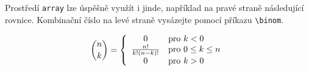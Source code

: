 \documentclass[hidelinks, twocolumn, a4paper, 11pt]{article}
\theoremstyle{definition}
\begin{document}
Prostředí \verb|array| lze úspěšně využít i jinde, například na pravé straně následující rovnice. 
Kombinační číslo na levé straně vysázejte pomocí příkazu \verb|\binom|.

\[
    \binom{n}{k}
    =
    \left\{
    \begin{array}{c l}
        0 & \text{pro } k<0 \\
        \frac{n!}{k!(n-k)!} & \text{pro } 0 \leq k \leq n \\
        0 & \text{pro } k>0
    \end{array} \right.
\]
\end{document}
